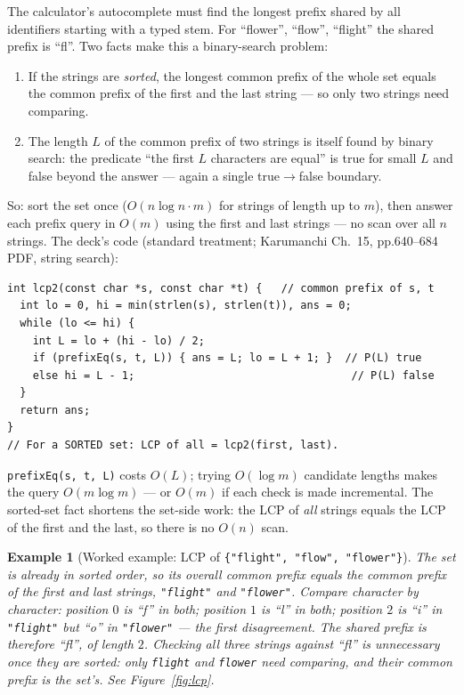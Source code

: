 \documentclass[11pt]{article}
\newtheorem{example}{Example}[section]
\begin{document}
The calculator's autocomplete must find the longest prefix shared by all identifiers starting with a typed stem. For ``flower'', ``flow'', ``flight'' the shared prefix is ``fl''. Two facts make this a binary-search problem:

\begin{enumerate}
  \item If the strings are \emph{sorted}, the longest common prefix of the whole set equals the common prefix of the first and the last string --- so only two strings need comparing.
  \item The length $L$ of the common prefix of two strings is itself found by binary search: the predicate ``the first $L$ characters are equal'' is true for small $L$ and false beyond the answer --- again a single true$\to$false boundary.
\end{enumerate}

So: sort the set once ($O(n \log n \cdot m)$ for strings of length up to $m$), then answer each prefix query in $O(m)$ using the first and last strings --- no scan over all $n$ strings. The deck's code (standard treatment; Karumanchi Ch.~15, pp.640--684 PDF, string search):

{\footnotesize
\begin{verbatim}
int lcp2(const char *s, const char *t) {   // common prefix of s, t
  int lo = 0, hi = min(strlen(s), strlen(t)), ans = 0;
  while (lo <= hi) {
    int L = lo + (hi - lo) / 2;
    if (prefixEq(s, t, L)) { ans = L; lo = L + 1; }  // P(L) true
    else hi = L - 1;                                  // P(L) false
  }
  return ans;
}
// For a SORTED set: LCP of all = lcp2(first, last).
\end{verbatim}
}

\texttt{prefixEq(s, t, L)} costs $O(L)$; trying $O(\log m)$ candidate lengths makes the query $O(m \log m)$ --- or $O(m)$ if each check is made incremental. The sorted-set fact shortens the set-side work: the LCP of \emph{all} strings equals the LCP of the first and the last, so there is no $O(n)$ scan.

\begin{example}[Worked example: LCP of \texttt{\{"flight", "flow", "flower"\}}]
The set is already in sorted order, so its overall common prefix equals the common prefix of the first and last strings, \texttt{"flight"} and \texttt{"flower"}. Compare character by character: position $0$ is ``f'' in both; position $1$ is ``l'' in both; position $2$ is ``i'' in \texttt{"flight"} but ``o'' in \texttt{"flower"} --- the first disagreement. The shared prefix is therefore ``fl'', of length $2$. Checking all three strings against ``fl'' is unnecessary once they are sorted: only \texttt{flight} and \texttt{flower} need comparing, and their common prefix \emph{is} the set's. See Figure~\ref{fig:lcp}.
\end{example}
\end{document}
